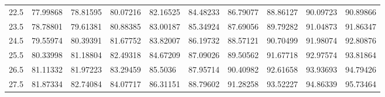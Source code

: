 \documentclass[10pt,twocolumn,letterpaper]{article}
\begin{document}
\begin{table}
\begin{tabular}{llllllllll}
    22.5            & 77.99868                               & 78.81595                               & 80.07216                                & 82.16525                                & 84.48233                                & 86.79077                                & 88.86127                                & 90.09723                                & 90.89866                                \\
    23.5            & 78.78801                               & 79.61381                               & 80.88385                                & 83.00187                                & 85.34924                                & 87.69056                                & 89.79282                                & 91.04873                                & 91.86347                                \\
    24.5            & 79.55974                               & 80.39391                               & 81.67752                                & 83.82007                                & 86.19732                                & 88.57121                                & 90.70499                                & 91.98074                                & 92.80876                                \\
    25.5            & 80.33998                               & 81.18804                               & 82.49318                                & 84.67209                                & 87.09026                                & 89.50562                                & 91.67718                                & 92.97574                                & 93.81864                                \\
    26.5            & 81.11332                               & 81.97223                               & 83.29459                                & 85.5036                                 & 87.95714                                & 90.40982                                & 92.61658                                & 93.93693                                & 94.79426                                \\
    27.5            & 81.87334                               & 82.74084                               & 84.07717                                & 86.31151                                & 88.79602                                & 91.28258                                & 93.52227                                & 94.86339                                & 95.73464                                \\

\end{tabular}
\end{table}
\end{document}
